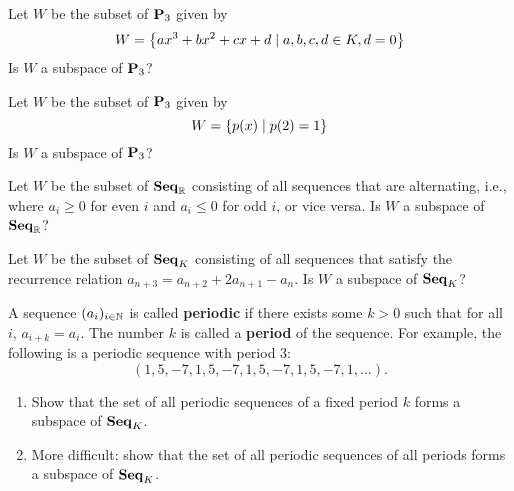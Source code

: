 \begin{ex}
  Let $W$ be the subset of\/ $\mathbf{P}_3$ given by
  \begin{equation*}
    W = \left\{ ax^3 + bx^2 + cx + d \mid a,b,c,d \in K, d = 0 \right\}
  \end{equation*}
  Is $W$ a subspace of $\mathbf{P}_3$?
\end{ex}

\begin{ex}
  Let $W$ be the subset of\/ $\mathbf{P}_3$ given by
  \begin{equation*}
    W = \left\{ p(x) \mid p(2) = 1 \right\}
  \end{equation*}
  Is $W$ a subspace of $\mathbf{P}_3$?
\end{ex}

\begin{ex}
  Let $W$ be the subset of $\mathbf{Seq}_{\mathbb{R}}$ consisting of all sequences
  that are alternating, i.e., where $a_i\geq 0$ for even $i$ and
  $a_i\leq 0$ for odd $i$, or vice versa. Is $W$ a subspace of
  $\mathbf{Seq}_{\mathbb{R}}$?
\end{ex}

\begin{ex}
  Let $W$ be the subset of $\mathbf{Seq}_{K}$ consisting of all sequences that
  satisfy the recurrence relation
  $a_{n+3} = a_{n+2} + 2a_{n+1} - a_{n}$. Is $W$ a subspace of
  $\mathbf{Seq}_{K}$?
\end{ex}

\begin{ex}\label{ex:periodic}
  A sequence $(a_i)_{i\in\mathbb{N}}$ is called \textbf{periodic}%
   if there exists some $k>0$ such that for
  all $i$, $a_{i+k}=a_i$. The number $k$ is called a \textbf{period}
  of the sequence. For example, the following is a periodic sequence
  with period $3$:
  \begin{equation*}
    (1,5,-7,1,5,-7,1,5,-7,1,5,-7,1,\ldots).
  \end{equation*}
  \begin{enumerate}
  \item Show that the set of all periodic sequences of a fixed period
    $k$ forms a subspace of $\mathbf{Seq}_K$.
  \item More difficult: show that the set of all periodic sequences of
    all periods forms a subspace of $\mathbf{Seq}_K$.
  \end{enumerate}
\end{ex}

